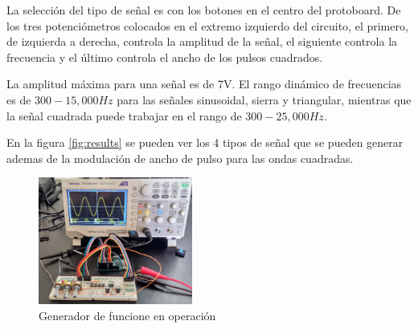 \documentclass[11pt]{article}
\begin{document}
La selección del tipo de señal es con los botones en el centro del protoboard. De los tres potenciómetros colocados en el extremo izquierdo del circuito, el primero, de izquierda a derecha, controla la amplitud de la señal, el siguiente controla la frecuencia y el último controla el ancho de los pulsos cuadrados.

La amplitud máxima para una señal es de 7V. El rango dinámico de frecuencias es de $300-15,000Hz$ para las señales sinusoidal, sierra y triangular, mientras que la señal cuadrada puede trabajar en el rango de $300-25,000Hz$.

En la figura \ref{fig:results} se pueden ver los 4 tipos de señal que se pueden generar ademas de la modulación de ancho de pulso para las ondas cuadradas.

\begin{figure}[H]
\centering
\includegraphics[width = 0.45\textwidth]{Operacion.jpg}
\caption{Generador de funcione en operación}
\label{fig:Operacion}
\end{figure}
\end{document}
